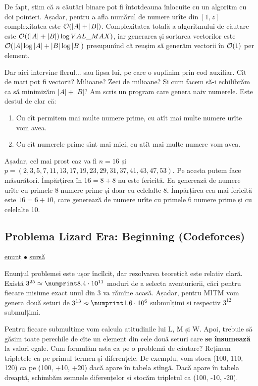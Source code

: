 \documentclass[../main.tex]{subfiles}
\begin{document}
De fapt, știm că $n$ căutări binare pot fi întotdeauna înlocuite cu un algoritm cu doi pointeri. Așadar, pentru a afla numărul de numere urîte din $[1,z]$ complexitatea este $\mathcal{O}(|A| + |B|)$. Complexitatea totală a algoritmului de căutare este $\mathcal{O}((|A| + |B|) \log VAL\_MAX )$, iar generarea și sortarea vectorilor este $\mathcal{O}(|A| \log |A| + |B| \log |B|)$ presupunînd că reușim să generăm vectorii în $\mathcal{O}(1)$ per element.

Dar aici intervine flerul... sau lipsa lui, pe care o suplinim prin cod auxiliar.  Cît de mari pot fi vectorii? Milioane? Zeci de milioane? Și cum facem să-i echilibrăm ca să minimizăm $|A| + |B|$? Am scris un program care genera naiv numerele. Este destul de clar că:

\begin{enumerate}
  \item Cu cît permitem mai multe numere prime, cu atît mai multe numere urîte vom avea.
  \item Cu cît numerele prime sînt mai mici, cu atît mai multe numere vom avea.
\end{enumerate}

Așadar, cel mai prost caz va fi $n=16$ și $p=(2, 3, 5, 7, 11, 13, 17, 19, 23, 29, 31, 37, 41, 43, 47, 53)$. Pe acesta putem face măsurători. Împărțirea în $16=8+8$ nu este fericită. Ea generează  de numere urîte cu primele 8 numere prime și doar  cu celelalte 8. Împărțirea cea mai fericită este $16=6+10$, care generează  de numere urîte cu primele 6 numere prime și  cu celelalte 10.


\subsection{Problema Lizard Era: Beginning (Codeforces)}
\label{problem:lizard-era-beginning}

\href{https://codeforces.com/contest/585/problem/D}{enunț}
$\bullet$
\hyperref[code:lizard-era-beginning]{sursă}

Enunțul problemei este ușor încîlcit, dar rezolvarea teoretică este relativ clară. Există $3^{25} \approx \np{8.4} \cdot 10^{11}$ moduri de a selecta aventurierii, căci pentru fiecare misiune exact unul din 3 va rămîne acasă. Așadar, pentru MITM vom genera două seturi de $3^{13} \approx \np{1.6} \cdot 10^6$ submulțimi și respectiv $3^{12}$ submulțimi.

Pentru fiecare submulțime vom calcula atitudinile lui L, M și W. Apoi, trebuie să găsim toate perechile de cîte un element din cele două seturi care \textbf{se însumează} la valori egale. Cum formulăm asta ca pe o problemă de căutare? Reținem tripletele ca pe primul termen și diferențele. De exemplu, vom stoca (100, 110, 120) ca pe (100, +10, +20) dacă apare în tabela stîngă. Dacă apare în tabela dreaptă, schimbăm semnele diferențelor și stocăm tripletul ca (100, -10, -20).
\end{document}
